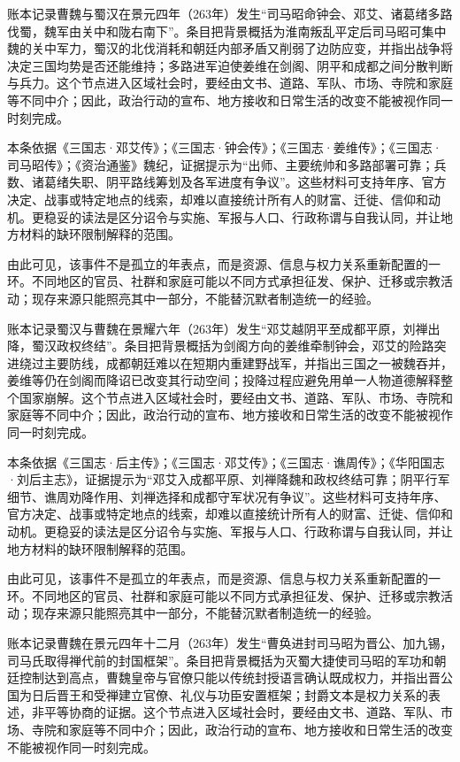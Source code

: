 账本记录曹魏与蜀汉在景元四年（263年）发生“司马昭命钟会、邓艾、诸葛绪多路伐蜀，魏军由关中和陇右南下”。条目把背景概括为淮南叛乱平定后司马昭可集中魏的关中军力，蜀汉的北伐消耗和朝廷内部矛盾又削弱了边防应变，并指出战争将决定三国均势是否还能维持；多路进军迫使姜维在剑阁、阴平和成都之间分散判断与兵力。这个节点进入区域社会时，要经由文书、道路、军队、市场、寺院和家庭等不同中介；因此，政治行动的宣布、地方接收和日常生活的改变不能被视作同一时刻完成。

本条依据《三国志·邓艾传》；《三国志·钟会传》；《三国志·姜维传》；《三国志·司马昭传》；《资治通鉴》魏纪，证据提示为“出师、主要统帅和多路部署可靠；兵数、诸葛绪失职、阴平路线筹划及各军进度有争议”。这些材料可支持年序、官方决定、战事或特定地点的线索，却难以直接统计所有人的财富、迁徙、信仰和动机。更稳妥的读法是区分诏令与实施、军报与人口、行政称谓与自我认同，并让地方材料的缺环限制解释的范围。

由此可见，该事件不是孤立的年表点，而是资源、信息与权力关系重新配置的一环。不同地区的官员、社群和家庭可能以不同方式承担征发、保护、迁移或宗教活动；现存来源只能照亮其中一部分，不能替沉默者制造统一的经验。

账本记录蜀汉与曹魏在景耀六年（263年）发生“邓艾越阴平至成都平原，刘禅出降，蜀汉政权终结”。条目把背景概括为剑阁方向的姜维牵制钟会，邓艾的险路突进绕过主要防线，成都朝廷难以在短期内重建野战军，并指出三国之一被魏吞并，姜维等仍在剑阁而降诏已改变其行动空间；投降过程应避免用单一人物道德解释整个国家崩解。这个节点进入区域社会时，要经由文书、道路、军队、市场、寺院和家庭等不同中介；因此，政治行动的宣布、地方接收和日常生活的改变不能被视作同一时刻完成。

本条依据《三国志·后主传》；《三国志·邓艾传》；《三国志·谯周传》；《华阳国志·刘后主志》，证据提示为“邓艾入成都平原、刘禅降魏和政权终结可靠；阴平行军细节、谯周劝降作用、刘禅选择和成都守军状况有争议”。这些材料可支持年序、官方决定、战事或特定地点的线索，却难以直接统计所有人的财富、迁徙、信仰和动机。更稳妥的读法是区分诏令与实施、军报与人口、行政称谓与自我认同，并让地方材料的缺环限制解释的范围。

由此可见，该事件不是孤立的年表点，而是资源、信息与权力关系重新配置的一环。不同地区的官员、社群和家庭可能以不同方式承担征发、保护、迁移或宗教活动；现存来源只能照亮其中一部分，不能替沉默者制造统一的经验。

账本记录曹魏在景元四年十二月（263年）发生“曹奂进封司马昭为晋公、加九锡，司马氏取得禅代前的封国框架”。条目把背景概括为灭蜀大捷使司马昭的军功和朝廷控制达到高点，曹魏皇帝与官僚只能以传统封授语言确认既成权力，并指出晋公国为日后晋王和受禅建立官僚、礼仪与功臣安置框架；封爵文本是权力关系的表述，非平等协商的证据。这个节点进入区域社会时，要经由文书、道路、军队、市场、寺院和家庭等不同中介；因此，政治行动的宣布、地方接收和日常生活的改变不能被视作同一时刻完成。

